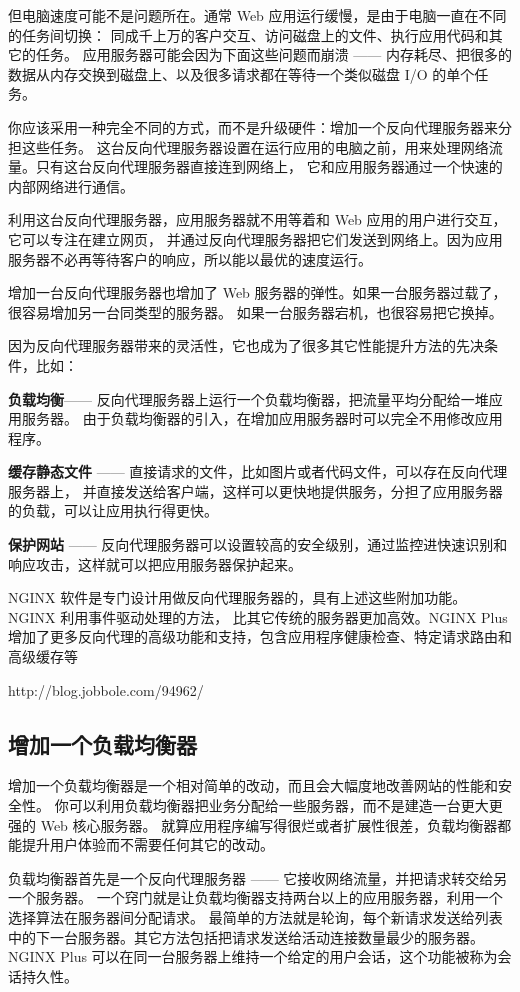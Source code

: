 \documentclass{book}
\begin{document}
但电脑速度可能不是问题所在。通常 Web 应用运行缓慢，是由于电脑一直在不同的任务间切换：
同成千上万的客户交互、访问磁盘上的文件、执行应用代码和其它的任务。
应用服务器可能会因为下面这些问题而崩溃 —— 内存耗尽、把很多的数据从内存交换到磁盘上、以及很多请求都在等待一个类似磁盘 I/O 的单个任务。

你应该采用一种完全不同的方式，而不是升级硬件：增加一个反向代理服务器来分担这些任务。
这台反向代理服务器设置在运行应用的电脑之前，用来处理网络流量。只有这台反向代理服务器直接连到网络上，
它和应用服务器通过一个快速的内部网络进行通信。

利用这台反向代理服务器，应用服务器就不用等着和 Web 应用的用户进行交互，它可以专注在建立网页，
并通过反向代理服务器把它们发送到网络上。因为应用服务器不必再等待客户的响应，所以能以最优的速度运行。

增加一台反向代理服务器也增加了 Web 服务器的弹性。如果一台服务器过载了，很容易增加另一台同类型的服务器。
如果一台服务器宕机，也很容易把它换掉。

因为反向代理服务器带来的灵活性，它也成为了很多其它性能提升方法的先决条件，比如：

\textbf{负载均衡}—— 反向代理服务器上运行一个负载均衡器，把流量平均分配给一堆应用服务器。
由于负载均衡器的引入，在增加应用服务器时可以完全不用修改应用程序。

\textbf{缓存静态文件} —— 直接请求的文件，比如图片或者代码文件，可以存在反向代理服务器上，
并直接发送给客户端，这样可以更快地提供服务，分担了应用服务器的负载，可以让应用执行得更快。

\textbf{保护网站} —— 反向代理服务器可以设置较高的安全级别，通过监控进快速识别和响应攻击，这样就可以把应用服务器保护起来。

NGINX 软件是专门设计用做反向代理服务器的，具有上述这些附加功能。NGINX 利用事件驱动处理的方法，
比其它传统的服务器更加高效。NGINX Plus 增加了更多反向代理的高级功能和支持，包含应用程序健康检查、特定请求路由和高级缓存等

http://blog.jobbole.com/94962/

\subsection{增加一个负载均衡器}

增加一个负载均衡器是一个相对简单的改动，而且会大幅度地改善网站的性能和安全性。
你可以利用负载均衡器把业务分配给一些服务器，而不是建造一台更大更强的 Web 核心服务器。
就算应用程序编写得很烂或者扩展性很差，负载均衡器都能提升用户体验而不需要任何其它的改动。

负载均衡器首先是一个反向代理服务器 —— 它接收网络流量，并把请求转交给另一个服务器。
一个窍门就是让负载均衡器支持两台以上的应用服务器，利用一个选择算法在服务器间分配请求。
最简单的方法就是轮询，每个新请求发送给列表中的下一台服务器。其它方法包括把请求发送给活动连接数量最少的服务器。
NGINX Plus 可以在同一台服务器上维持一个给定的用户会话，这个功能被称为会话持久性。
\end{document}
